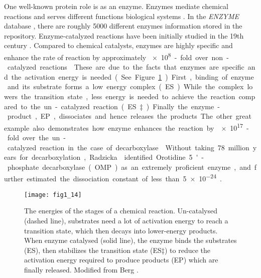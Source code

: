 \begin{refsection}
One well-known protein role is as an enzyme. Enzymes mediate chemical
reactions and serves different functions biological
systems \cite{AthelCornish-Bowden2012,Stryer1995,Radzicka1995}. In the
\emph{ENZYME} database \cite{Schomburg2004}, there are roughly 5000 different
enzymes information stored in the repository.  Enzyme-catalyzed reactions have
been initially studied in the 19th century \cite{AthelCornish-Bowden2012}.
Compared to chemical catalysts, enzymes are highly specific and enhance the
rate of reaction by approximately \SI{e8}-fold over non-catalyzed reactions
\cite{Stryer1995}. These are due to the facts that enzymes are specific and the
activation energy is needed. (See Figure \ref{fig:enzyme-intro}) First, binding
of enzyme and its substrate forms a low energy complex (ES).  While the complex
lowers the transition state, less energy is needed to achieve the reaction
compared to the un-catalyzed reaction (ES‡).  Finally the enzyme-product, EP,
dissociates and hence releases the products.  The other great example also
demonstrates how enzyme enhances the reaction by \SI{e17}-fold over the
un-catalyzed reaction in the case of decarboxylase \cite{Radzicka1995}. Without
taking 78 million years for decarboxylation, Radzicka  identified
Orotidine 5'-phosphate decarboxylase (OMP) as an extremely proficient enzyme,
and further estimated the dissociation constant of less than \SI{5e-24}{\Molar}
\cite{Radzicka1995}.
\begin{figure}[h!] 
    \centering \texttt{[image: fig1\_14]}
    \caption[The energies of the stages of a chemical reaction. Uncatalysed
    (dashed line), substrates need a lot of activation energy to reach a
transition state, which then decays into lower-energy products. When enzyme
catalysed (solid line), the enzyme binds the substrates (ES), then stabilizes
the transition state (ES‡) to reduce the activation energy required to produce
products (EP) which are finally released.]{The energies of the stages of a
    chemical reaction. Un-catalysed (dashed line), substrates need a lot of
    activation energy to reach a transition state, which then decays into
    lower-energy products. When enzyme catalysed (solid line), the enzyme binds
    the substrates (ES), then stabilizes the transition state (ES‡) to reduce
    the activation energy required to produce products (EP) which are finally
    released. Modified from Berg  \cite{Berg2002}.} 
    \label{fig:enzyme-intro}
\end{figure}


\end{refsection}
